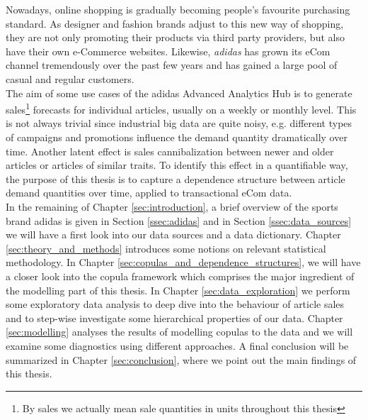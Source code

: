

Nowadays, online shopping is gradually becoming people's favourite purchasing standard. As designer and fashion brands adjust to this new way of shopping, they are not only promoting their products via third party 	providers, but also have their own e-Commerce websites. Likewise, \textit{adidas} has grown its eCom channel tremendously over the past few years and has gained a large pool of casual and regular customers.\\

The aim of some use cases of the adidas Advanced Analytics Hub is to generate sales\footnote{By sales we actually mean sale quantities in units throughout this thesis} forecasts for individual articles, usually on a weekly or monthly level. This is not always trivial since industrial big data are quite noisy, e.g. different types of campaigns and promotions influence the demand quantity dramatically over time. Another latent effect is sales cannibalization between newer and older articles or articles of similar traits. To identify this effect in a quantifiable way, the purpose of this thesis is to capture a dependence structure between article demand quantities over time, applied to transactional eCom data. \\

In the remaining of Chapter \ref{sec:introduction}, a brief overview of the sports brand adidas is given in Section \ref{ssec:adidas} and in Section \ref{ssec:data_sources} we will have a first look into our data sources and a data dictionary. Chapter \ref{sec:theory_and_methods} introduces some notions on relevant statistical methodology. In Chapter \ref{sec:copulas_and_dependence_structures}, we will have a closer look into the copula framework which comprises the major ingredient of the modelling part of this thesis. In Chapter \ref{sec:data_exploration} we perform some exploratory data analysis to deep dive into the behaviour of article sales and to step-wise investigate some hierarchical properties of our data.  Chapter \ref{sec:modelling} analyses the results of modelling copulas to the data and we will examine some diagnostics using different approaches. A final conclusion will be summarized in Chapter \ref{sec:conclusion}, where we point out the main findings of this thesis.




